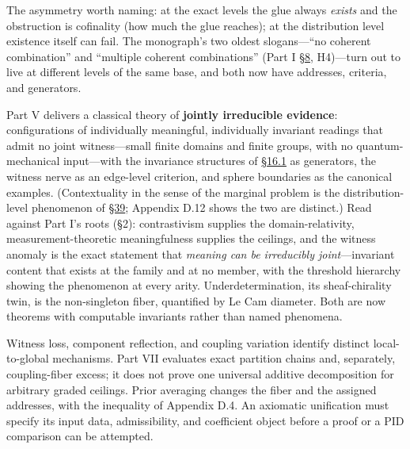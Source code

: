 The asymmetry worth naming: at the exact levels the glue always \emph{exists} and the obstruction is cofinality (how much the glue reaches); at the distribution level existence itself can fail. The monograph's two oldest slogans---\hspace{0pt}``no coherent combination'' and ``multiple coherent combinations'' (Part I \hyperlink{sec:8}{§8}, H4)---\hspace{0pt}turn out to live at different levels of the same base, and both now have addresses, criteria, and generators.


\begin{thmrem}

Part V delivers a classical theory of \textbf{jointly irreducible evidence}: configurations of individually meaningful, individually invariant readings that admit no joint witness---\hspace{0pt}small finite domains and finite groups, with no quantum-mechanical input---\hspace{0pt}with the invariance structures of \hyperlink{sec:16.1}{§16.1} as generators, the witness nerve as an edge-level criterion, and sphere boundaries as the canonical examples. (Contextuality in the sense of the marginal problem is the distribution-level phenomenon of \hyperlink{sec:39}{§39}; Appendix D.12 shows the two are distinct.) Read against Part I's roots (§2): contrastivism supplies the domain-relativity, measurement-theoretic meaningfulness supplies the ceilings, and the witness anomaly is the exact statement that \emph{meaning can be irreducibly joint}---\hspace{0pt}invariant content that exists at the family and at no member, with the threshold hierarchy showing the phenomenon at every arity. Underdetermination, its sheaf-chirality twin, is the non-singleton fiber, quantified by Le Cam diameter. Both are now theorems with computable invariants rather than named phenomena.
\end{thmrem}

\begin{thmrem}

Witness loss, component reflection, and coupling variation identify distinct local-to-global mechanisms. Part VII evaluates exact partition chains and, separately, coupling-fiber excess; it does not prove one universal additive decomposition for arbitrary graded ceilings. Prior averaging changes the fiber and the assigned addresses, with the inequality of Appendix D.4. An axiomatic unification must specify its input data, admissibility, and coefficient object before a proof or a PID comparison can be attempted.
\end{thmrem}

